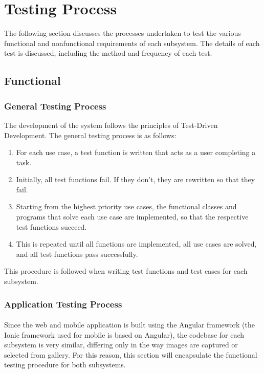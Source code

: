 \documentclass[a4paper, 11pt]{article}
\begin{document}
\section{Testing Process}
The following section discusses the processes undertaken to test the various functional and nonfunctional requirements of each subsystem. The details of each test is discussed, including the method and frequency of each test.

    \subsection{Functional}
    
        \subsubsection{General Testing Process}
        The development of the system follows the principles of Test-Driven Development. The general testing process is as follows:
        \begin{enumerate}
            \item For each use case, a test function is written that acts as a user completing a task.
            \item Initially, all test functions fail. If they don’t, they are rewritten so that they fail.
            \item Starting from the highest priority use cases, the functional classes and programs that solve each use case are implemented, so that the respective test functions succeed.
            \item This is repeated until all functions are implemented, all use cases are solved, and all test functions pass successfully.
        \end{enumerate}
        This procedure is followed when writing test functions and test cases for each subsystem.
        
        \subsubsection{Application Testing Process}
        \paragraph{}
        Since the web and mobile application is built using the Angular framework (the Ionic framework used for mobile is based on Angular), the codebase for each subsystem is very similar, differing only in the way images are captured or selected from gallery. For this reason, this section will encapsulate the functional testing procedure for both subsystems.
\end{document}
